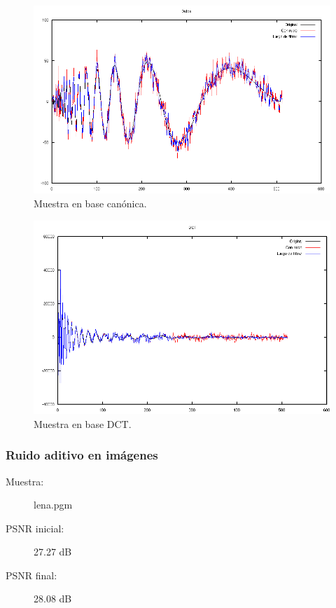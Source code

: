 \documentclass[a4paper,10pt,twoside]{article}
\begin{document}
\begin{figure}[H]
  \centering
  \includegraphics[width=15cm]{graficos/dopp_aditivo_umbralizar_muestra.png}
  \caption{Muestra en base canónica.}
\end{figure}

\begin{figure}[H]
  \centering
  \includegraphics[width=15cm]{graficos/dopp_aditivo_umbralizar_dct.png} 
  \caption{Muestra en base DCT.}
\end{figure}


\subsubsection{Ruido aditivo en imágenes}

\begin{description}
  \item[Muestra:] lena.pgm
  \item[PSNR inicial:] 27.27 dB
  \item[PSNR final:] 28.08 dB
\end{description}
\end{document}
